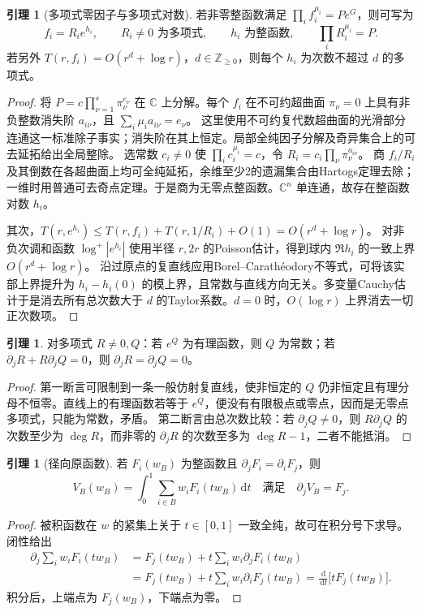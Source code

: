 \documentclass[UTF8,a4paper,zihao=-4,fontset=none]{ctexart}
\numberwithin{equation}{section}
\theoremstyle{definition}
\newtheorem{lemma}[theorem]{引理}
\theoremstyle{definition}\newtheorem{definition}[theorem]{定义}
\newcommand{\C}{\mathbb C}
\newcommand{\NN}{\mathbb Z_{\ge0}}
\newcommand{\dd}{\,\mathrm d}
\begin{document}
\begin{lemma}[多项式零因子与多项式对数]\label{lem:factor}
若非零整函数满足 $\prod_i f_i^{\mu_i}=Pe^G$，则可写为
\[
 f_i=R_i e^{h_i},\qquad R_i\ne0\text{ 为多项式},\qquad
 h_i\text{ 为整函数},\qquad\prod_iR_i^{\mu_i}=P.
\]
若另外 $T(r,f_i)=O(r^d+\log r)$，$d\in\NN$，则每个 $h_i$ 为次数不超过 $d$ 的多项式。
\end{lemma}
\begin{proof}
将 $P=c\prod_{\nu=1}^s\pi_\nu^{e_\nu}$ 在 $\C$ 上分解。每个 $f_i$ 在不可约超曲面 $\pi_\nu=0$ 上具有非负整数消失阶 $a_{i\nu}$，且
$\sum_i\mu_i a_{i\nu}=e_\nu$。
这里使用不可约复代数超曲面的光滑部分连通这一标准除子事实；消失阶在其上恒定。局部全纯因子分解及奇异集合上的可去延拓给出全局整除。
选常数 $c_i\ne0$ 使 $\prod_i c_i^{\mu_i}=c$，令 $R_i=c_i\prod_\nu\pi_\nu^{a_{i\nu}}$。
商 $f_i/R_i$ 及其倒数在各超曲面上均可全纯延拓，余维至少2的遗漏集合由Hartogs定理去除；一维时用普通可去奇点定理。于是商为无零点整函数。$\C^n$ 单连通，故存在整函数对数 $h_i$。

其次，$T(r,e^{h_i})\le T(r,f_i)+T(r,1/R_i)+O(1)=O(r^d+\log r)$。
对非负次调和函数 $\log^+|e^{h_i}|$ 使用半径 $r,2r$ 的Poisson估计，得到球内 $\Re h_i$ 的一致上界 $O(r^d+\log r)$。
沿过原点的复直线应用Borel--Carath\'eodory不等式，可将该实部上界提升为 $h_i-h_i(0)$ 的模上界，且常数与直线方向无关。多变量Cauchy估计于是消去所有总次数大于 $d$ 的Taylor系数。$d=0$ 时，$O(\log r)$ 上界消去一切正次数项。
\end{proof}

\begin{lemma}\label{lem:poly}
对多项式 $R\ne0,Q$：若 $e^Q$ 为有理函数，则 $Q$ 为常数；若 $\partial_jR+R\partial_jQ=0$，则 $\partial_jR=\partial_jQ=0$。
\end{lemma}
\begin{proof}
第一断言可限制到一条一般仿射复直线，使非恒定的 $Q$ 仍非恒定且有理分母不恒零。直线上的有理函数若等于 $e^Q$，便没有有限极点或零点，因而是无零点多项式，只能为常数，矛盾。
第二断言由总次数比较：若 $\partial_jQ\ne0$，则 $R\partial_jQ$ 的次数至少为 $\deg R$，而非零的 $\partial_jR$ 的次数至多为 $\deg R-1$，二者不能抵消。
\end{proof}

\begin{lemma}[径向原函数]\label{lem:radial}
若 $F_i(w_B)$ 为整函数且 $\partial_jF_i=\partial_iF_j$，则
\[
 V_B(w_B)=\int_0^1\sum_{i\in B}w_iF_i(tw_B)\dd t
 \quad\text{满足}\quad \partial_jV_B=F_j.
\]
\end{lemma}
\begin{proof}
被积函数在 $w$ 的紧集上关于 $t\in[0,1]$ 一致全纯，故可在积分号下求导。闭性给出
\begin{align*}
 \partial_j\sum_iw_iF_i(tw_B)
 &=F_j(tw_B)+t\sum_iw_i\partial_jF_i(tw_B)\\
 &=F_j(tw_B)+t\sum_iw_i\partial_iF_j(tw_B)
 =\frac{\dd}{\dd t}\bigl[tF_j(tw_B)\bigr].
\end{align*}
积分后，上端点为 $F_j(w_B)$，下端点为零。
\end{proof}
\end{document}
